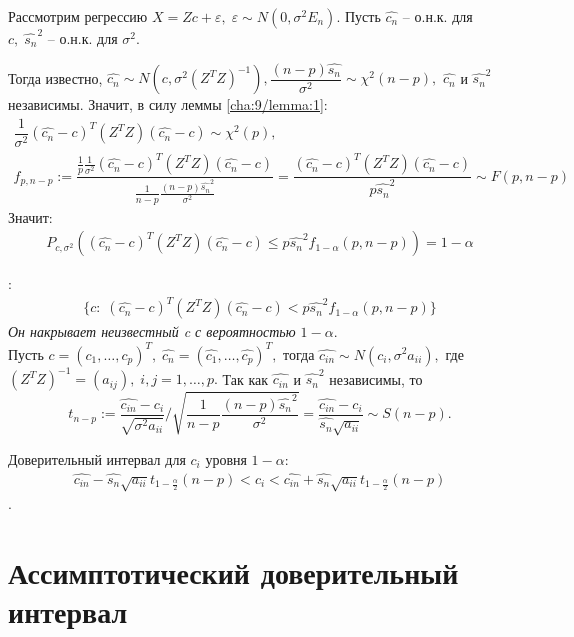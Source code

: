 Рассмотрим регрессию $ X = Zc + \varepsilon, \; \varepsilon \sim N(0, \sigma^2E_n) $. Пусть $ \hat{c_n} $ -- о.н.к. для $ c, \; \hat{s_n}^2 $ -- о.н.к. для $ \sigma^2 $.

Тогда известно, $ \hat{c_n} \sim N(c, \sigma^2(Z^TZ)^{-1}), \dfrac{(n - p)\hat{s_n}}{\sigma^2} \sim \chi^2(n - p), $ $ \hat{c_n} $ и $ \hat{s_n}^2 $ независимы. Значит, в силу леммы \ref{cha:9/lemma:1}: 
$$ \begin{gathered} 
	\dfrac{1}{\sigma^2}(\hat{c_n} - c)^T(Z^TZ)(\hat{c_n} - c) \sim \chi^2(p), \\ f_{p, n - p} := \dfrac{\frac{1}{p}\frac{1}{\sigma^2}(\hat{c_n} - c)^T(Z^TZ)(\hat{c_n} - c)}{\frac{1}{n - p}\frac{(n - p)\hat{s_n}^2}{\sigma^2}} = \dfrac{(\hat{c_n} - c)^T(Z^TZ)(\hat{c_n} - c)}{p\hat{s_n}^2} \sim F(p, n - p)
\end{gathered} $$ 
Значит: 
$$ \begin{gathered} 
	P_{c, \sigma^2}((\hat{c_n} - c)^T(Z^TZ)(\hat{c_n} - c) \leq p\hat{s_n}^2f_{1 - \alpha}(p, n - p)) = 1 - \alpha 
\end{gathered} $$ 

: 
$$ \begin{gathered} \lbrace c: \; (\hat{c_n} - c)^T(Z^TZ)(\hat{c_n} - c) < p\hat{s_n}^2f_{1 - \alpha}(p, n - p)\rbrace \end{gathered} $$ 
\textit{ Он накрывает неизвестный c с вероятностью $ 1 - \alpha $}.\\

Пусть $ c = (c_1, \ldots, c_p)^T, \; \hat{c_n} = (\hat{c_1}, \ldots, \hat{c_p})^T,  $ тогда $ \hat{c_{in}} \sim N(c_i, \sigma^2a_{ii}),  $ где $ (Z^TZ)^{-1} = (a_{ij}), \; i,j = 1, \ldots, p. $ Так как $ \hat{c_{in}} $ и $ \hat{s_n}^2$ независимы, то $$ t_{n - p}:= \dfrac{\hat{c_{in}} - c_i}{\sqrt{\sigma^2a_{ii}}} / \sqrt{\dfrac{1}{n - p}\dfrac{(n - p)\hat{s_n}^2}{\sigma^2}} = \dfrac{\hat{c_{in}} - c_i}{\hat{s_n}\sqrt{a_{ii}}} \sim S(n - p). $$

Доверительный интервал для $ c_i $ уровня $ 1 - \alpha :$ $$ \begin{gathered} \hat{c_{in}} - \hat{s_n}\sqrt{a_{ii}}t_{1 - \frac{\alpha}{2}}(n - p) < c_i < \hat{c_{in}} + \hat{s_n}\sqrt{a_{ii}}t_{1 - \frac{\alpha}{2}}(n - p) \end{gathered} $$.

\section{Ассимптотический доверительный интервал}

